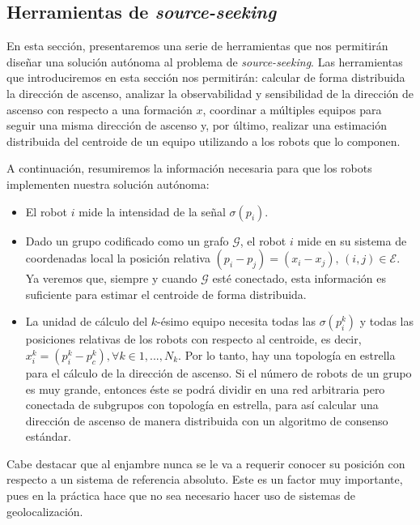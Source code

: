 
\subsection{Herramientas de \textit{source-seeking}}

En esta sección, presentaremos una serie de herramientas que nos permitirán diseñar una solución autónoma al problema de \textit{source-seeking}. Las herramientas que introduciremos en esta sección nos permitirán: calcular de forma distribuida la dirección de ascenso, analizar la observabilidad y sensibilidad de la dirección de ascenso con respecto a una formación $x$, coordinar a múltiples equipos para seguir una misma dirección de ascenso y, por último, realizar una estimación distribuida del centroide de un equipo utilizando a los robots que lo componen.


A continuación, resumiremos la información necesaria para que los robots implementen nuestra solución autónoma:

\begin{itemize}
    \item El robot $i$ mide la intensidad de la señal $\sigma(p_i)$.\\
    
    \item Dado un grupo codificado como un grafo $\mathcal{G}$, el robot $i$ mide en su sistema de coordenadas local la posición relativa $(p_i - p_j) = (x_i - x_j), \, (i,j)\in\mathcal{E}$. Ya veremos que, siempre y cuando $\mathcal{G}$ esté conectado, esta información es suficiente para estimar el centroide de forma distribuida.\\
    
    \item La unidad de cálculo del $k$-ésimo equipo necesita todas las $\sigma(p^k_i)$ y todas las posiciones relativas de los robots con respecto al centroide, es decir, $x_i^k = (p^k_i - p^k_c), \forall k\in{1,...,N_k}$. Por lo tanto, hay una topología en estrella para el cálculo de la dirección de ascenso. Si el número de robots de un grupo es muy grande, entonces éste se podrá dividir en una red arbitraria pero conectada de subgrupos con topología en estrella, para así calcular una dirección de ascenso de manera distribuida con un algoritmo de consenso estándar.\\
\end{itemize}

Cabe destacar que al enjambre nunca se le va a requerir conocer su posición con respecto a un sistema de referencia absoluto. Este es un factor muy importante, pues en la práctica hace que no sea necesario hacer uso de sistemas de geolocalización.


